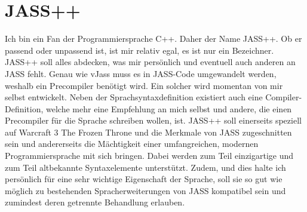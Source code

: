 \section{JASS++}
Ich bin ein Fan der Programmiersprache C++. Daher der Name JASS++. Ob er passend oder unpassend ist, ist mir relativ egal, es ist nur ein Bezeichner.
JASS++ soll alles abdecken, was mir persönlich und eventuell auch anderen an JASS fehlt.
Genau wie vJass muss es in JASS-Code umgewandelt werden, weshalb ein Precompiler benötigt wird. Ein solcher wird momentan von mir selbst entwickelt.
Neben der Sprachsyntaxdefinition existiert auch eine Compiler-Definition, welche mehr eine Empfehlung an mich selbst und andere, die einen Precompiler
für die Sprache schreiben wollen, ist.
JASS++ soll einerseits speziell auf Warcraft 3 The Frozen Throne und die Merkmale von JASS zugeschnitten sein und andererseits die Mächtigkeit einer
umfangreichen, modernen Programmiersprache mit sich bringen.
Dabei werden zum Teil einzigartige und zum Teil altbekannte Syntaxelemente unterstützt.
Zudem, und dies halte ich persönlich für eine sehr wichtige Eigenschaft der Sprache, soll sie so gut wie möglich zu bestehenden Spracherweiterungen
von JASS kompatibel sein und zumindest deren getrennte Behandlung erlauben.

